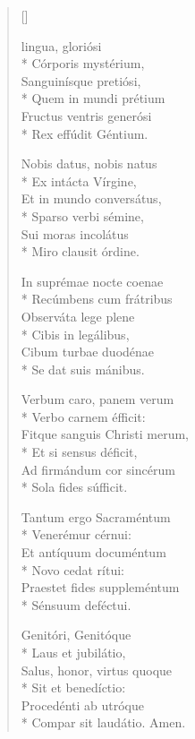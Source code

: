 \newHymn
{}

\pointtrans

\begin{multicols}{2}
\begin{verse}[\versewidth]

 lingua, gloriósi \\*
Córporis mystérium,     \\ 
Sanguinísque pretiósi,    \\*  
Quem in mundi prétium     \\
Fructus ventris generósi    \\*
Rex effúdit Géntium.        
\pointtrans                            

Nobis datus, nobis natus    \\*
Ex intácta Vírgine,         \\
Et in mundo conversátus,    \\*
Sparso verbi sémine,        \\
Sui moras incolátus         \\*
Miro clausit órdine.        
                            

In suprémae nocte coenae     \\*
Recúmbens cum frátribus     \\
Observáta lege plene        \\*
Cibis in legálibus,         \\
Cibum turbae duodénae       \\*
Se dat suis mánibus.        

Verbum caro, panem verum    \\*
Verbo carnem éfficit:       \\
Fitque sanguis Christi merum, \\*
Et si sensus déficit,       \\
Ad firmándum cor sincérum   \\*
Sola fides súfficit.        

Tantum ergo Sacraméntum     \\*
Venerémur cérnui:           \\
Et antíquum documéntum      \\*
Novo cedat rítui:           \\
Praestet fides suppleméntum \\*
Sénsuum deféctui.           

Genitóri, Genitóque         \\*
Laus et jubilátio,          \\
Salus, honor, virtus quoque \\*
Sit et benedíctio:          \\
Procedénti ab utróque       \\*
Compar sit laudátio.
Amen. %

\end{verse}
\end{multicols}

